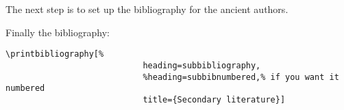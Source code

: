 \documentclass[a4paper,
10pt,
english
]{ltxdoc}
\begin{document}
The next step is to set up the bibliography for the ancient authors.


Finally the bibliography:
\begin{lstlisting}
\printbibliography[%
							heading=subbibliography,
							%heading=subbibnumbered,% if you want it numbered
							title={Secondary literature}]
\end{lstlisting}

\nocite{*}
\begin{bsp}
\renewcommand\bibfont{\normalfont\footnotesize}
\printbibheading[%
							heading=bibliography,%
							title={Bibliography}] %
\printbibliography[%
							notkeyword=ancient,%
							notkeyword=corpus,%
							heading=subbibliography,
							title={Secondary literature}]
\end{bsp}
\end{document}
